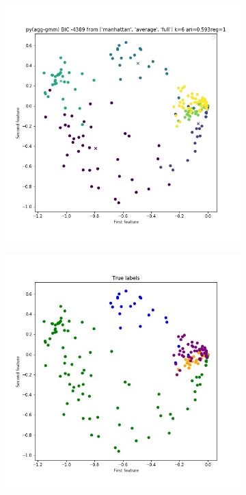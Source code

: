 \documentclass{article}
\begin{document}
\begin{figure}[h!]
\centering
\begin{subfigure}[b]{0.3\linewidth}
  \includegraphics[width=\linewidth]{python_bic_k6.jpg}
\end{subfigure}
\begin{subfigure}[b]{0.3\linewidth}
  \includegraphics[width=\linewidth]{true.jpg}

\end{subfigure}
\end{figure}
\end{document}
